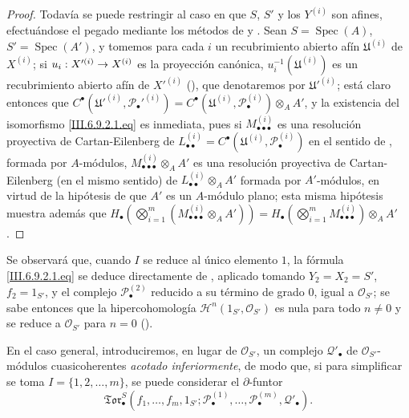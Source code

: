 \documentclass[10pt,oneside,openany]{book}
\theoremstyle{egaenv}\newtheorem*{env}{---}
\theoremstyle{egastatement}
\theoremstyle{egadescription}
\renewcommand{\to}{\mathchoice{\longrightarrow}{\rightarrow}{\rightarrow}{\rightarrow}}
\begin{document}
\begin{proof}
Todavía se puede restringir al caso en que $S$, $S'$ y los $Y^{(i)}$ son
afines, efectuándose el pegado mediante los métodos de  y
. Sean $S=\operatorname{Spec}(A)$,
$S'=\operatorname{Spec}(A')$, y tomemos para cada $i$ un recubrimiento abierto
afín $\mathfrak U^{(i)}$ de $X^{(i)}$; si
$u_i:X'^{(i)}\to X^{(i)}$ es la proyección canónica,
$u_i^{-1}(\mathfrak U^{(i)})$ es un recubrimiento abierto afín de
$X'^{(i)}$ (), que denotaremos por
$\mathfrak U'^{(i)}$; está claro entonces que
$C^\bullet(\mathfrak U'^{(i)},\mathscr P_\bullet'^{(i)})
=C^\bullet(\mathfrak U^{(i)},\mathscr P_\bullet^{(i)})\otimes_A A'$,
y la existencia del isomorfismo \eqref{III.6.9.2.1.eq} es inmediata, pues si
$M_{\bullet\bullet\bullet}^{(i)}$ es una resolución proyectiva de
Cartan-Eilenberg de
$L_{\bullet\bullet}^{(i)}=C^\bullet(\mathfrak U^{(i)},
\mathscr P_\bullet^{(i)})$ en el sentido de , formada por
$A$-módulos, $M_{\bullet\bullet\bullet}^{(i)}\otimes_A A'$ es una resolución
proyectiva de Cartan-Eilenberg (en el mismo sentido) de
$L_{\bullet\bullet}^{(i)}\otimes_A A'$ formada por $A'$-módulos, en virtud
de la hipótesis de que $A'$ es un $A$-módulo plano; esta misma hipótesis
muestra además que
$H_\bullet(\bigotimes_{i=1}^m(M_{\bullet\bullet\bullet}^{(i)}\otimes_A A'))
=H_\bullet(\bigotimes_{i=1}^m M_{\bullet\bullet\bullet}^{(i)})\otimes_A A'$.
\end{proof}


\label{III.6.9.2.2}
Se observará que, cuando $I$ se reduce al único elemento $1$, la fórmula
\eqref{III.6.9.2.1.eq} se deduce directamente de , aplicado
tomando $Y_2=X_2=S'$, $f_2=1_{S'}$, y el complejo
$\mathscr P_\bullet^{(2)}$ reducido a su término de grado $0$, igual a
$\mathscr O_{S'}$; se sabe entonces que la hipercohomología
$\mathscr H^n(1_{S'},\mathscr O_{S'})$ es nula para todo $n\ne0$ y se reduce
a $\mathscr O_{S'}$ para $n=0$ ().


En el caso general, introduciremos, en lugar de $\mathscr O_{S'}$, un
complejo $\mathscr Q'_\bullet$ de $\mathscr O_{S'}$-módulos cuasicoherentes
\emph{acotado inferiormente}, de modo que, si para simplificar se toma
$I=\{1,2,\ldots,m\}$, se puede considerar el $\partial$-funtor
\[
  \mathfrak{Tor}_\bullet^S
  (f_1,\ldots,f_m,1_{S'};
   \mathscr P_\bullet^{(1)},\ldots,\mathscr P_\bullet^{(m)},
   \mathscr Q'_\bullet).
\]
\end{document}
